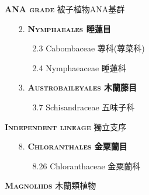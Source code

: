 \noindent \normalsize\textsc{\textbf{ANA grade} 被子植物ANA基群}\selectfont \\
\footnotesize\selectfont
\begin{enumerate}
  \item[2. ] \textbf{\textsc{Nymphaeales} 睡蓮目}   
    \begin{enumerate}
      \item[2.3] Cabombaceae 蓴科(蓴菜科)     
        
      \item[2.4] Nymphaeaceae 睡蓮科     
        
    \end{enumerate}
  \item[3. ] \textbf{\textsc{Austrobaileyales} 木蘭藤目}   
    \begin{enumerate}
      \item[3.7] Schisandraceae 五味子科     
        
    \end{enumerate}
\end{enumerate}
\vspace{2ex} 
\noindent \normalsize\textsc{\textbf{Independent lineage} 獨立支序}\selectfont \\
\footnotesize\selectfont
\begin{enumerate}
  \item[8. ] \textbf{\textsc{Chloranthales} 金粟蘭目}   
    \begin{enumerate}
      \item[8.26] Chloranthaceae 金粟蘭科     
        
    \end{enumerate}
\end{enumerate}
\vspace{2ex} 
\noindent \normalsize\textsc{\textbf{Magnoliids} 木蘭類植物}\selectfont \\
\footnotesize\selectfont
